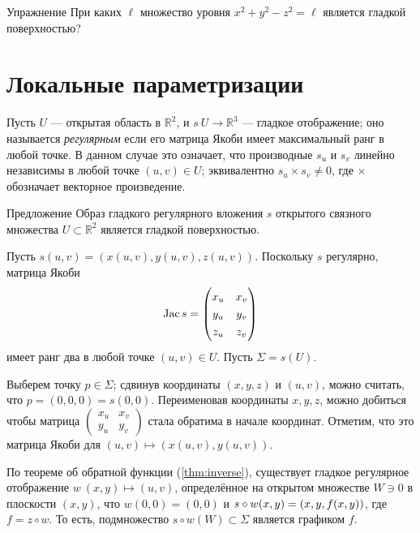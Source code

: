 \begin{thm}{Упражнение}\label{ex:hyperboloids}
При каких $\ell$ множество уровня $x^2+y^2-z^2=\ell$ является гладкой поверхностью?
\end{thm}

\section{Локальные параметризации}

Пусть $U$ --- открытая область в $\mathbb{R}^2$, и $s\:U\to \mathbb{R}^3$ --- гладкое отображение;
оно называется \emph{регулярным} если его матрица Якоби имеет максимальный ранг в любой точке.
В данном случае это означает, что производные $s_u$ и $s_v$ линейно независимы в любой точке $(u,v)\in U$;
эквивалентно $s_u\times s_v\ne 0$, где $\times$ обозначает векторное произведение.

\begin{thm}{Предложение}\label{prop:graph-chart}
Образ гладкого регулярного вложения $s$ открытого связного множества $U\subset \mathbb{R}^2$ является гладкой поверхностью.
\end{thm}

Пусть $s(u,v)=(x(u,v),y(u,v),z(u,v))$.
Поскольку $s$ регулярно, матрица Якоби
\[\Jac s=
\renewcommand\arraystretch{1.3}
\begin{pmatrix}
x_u&x_v\\
y_u&y_v\\
z_u&z_v
\end{pmatrix}
\]
имеет ранг два в любой точке $(u,v)\in U$.
Пусть $\Sigma=s(U)$.

Выберем точку $p\in \Sigma$; сдвинув координаты $(x,y,z)$ и $(u,v)$, можно считать, что $p = (0,0, 0) =s(0,0)$.
Переименовав координаты $x,y,z$, можно добиться чтобы 
матрица $\left(\begin{smallmatrix}
x_u&x_v\\
y_u&y_v
\end{smallmatrix}\right)$
стала обратима в начале координат.
Отметим, что это матрица Якоби для $(u,v)\mapsto (x(u,v),y(u,v))$.

По теореме об обратной функции (\ref{thm:inverse}), существует гладкое регулярное отображение
$w\:(x,y)\mapsto (u,v)$, определённое на открытом множестве $W\ni 0$ в плоскости $(x,y)$,
 что $w(0,0)=(0,0)$ и $s\circ w(x,y)\z=(x,y,f(x,y))$, где $f=z\circ w$.
То есть, подмножество $s\circ w(W)\subset \Sigma$ является графиком $f$.

